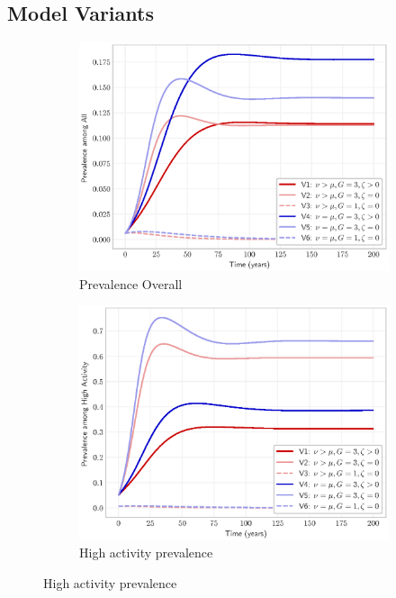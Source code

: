 \documentclass[10pt]{article}
\newlength{\figi}  \setlength{\figi}  {0.800\textwidth}
\newlength{\figii} \setlength{\figii} {0.490\textwidth}
\newlength{\figiii}\setlength{\figiii}{0.325\textwidth}
\numberwithin{equation}{section}
\begin{document}
\subsection{Model Variants}\label{ss:rd-variants}
\begin{figure}
  \centering
  \begin{subfigure}{\figiii}
    \includegraphics[width=\textwidth]{prevalence-all-compare.eps}
    \caption{Prevalence Overall}
    \label{fig:prevalence-variants-all}
  \end{subfigure}
  \begin{subfigure}{\figiii} %
    \includegraphics[width=\textwidth]{prevalence-high-compare.eps}
    \caption{High activity prevalence}

\end{subfigure}
\end{figure}
\end{document}
